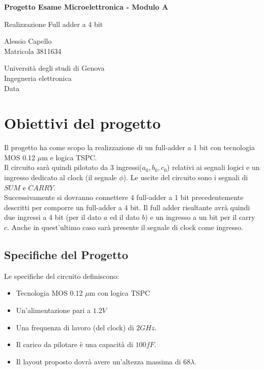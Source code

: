 \documentclass[12pt]{article} %
\begin{document}
\begin{center}
       \vspace*{1cm}
 
       \Large{\textbf{Progetto Esame Microelettronica - Modulo A}}
 
       \vspace{0.5cm}
        Realizzazione Full adder a 4 bit
 
       \vspace{1.5cm}
 
       Alessio Capello\\
 
       Matricola 3811634
 
       \vspace{1.5cm}
 
 
       Università degli studi di Genova\\
       Ingegneria elettronica\\
       Data   
\end{center}
\clearpage

\section{Obiettivi del progetto}
Il progetto ha come scopo la realizzazione di un full-adder a 1 bit con tecnologia MOS 0.12 $\mu$m e logica TSPC. \\
Il circuito sarà quindi pilotato da 3 ingressi($a_{0},b_{0}, c_{0}$) relativi ai segnali logici e un ingresso dedicato al clock (il segnale $\phi$).
Le uscite del circuito sono i segnali di $SUM$ e $CARRY$.\\
Successivamente si dovranno connettere 4 full-adder a 1 bit precedentemente descritti per comporre un full-adder a 4 bit.
Il full adder risultante avrà quindi due ingressi a 4 bit (per il dato $a$ ed il dato $b$) e un ingresso a un bit per il carry $c$. Anche in quest'ultimo caso sarà presente il segnale di clock come ingresso.
\subsection{Specifiche del Progetto}
Le specifiche del circuito definiscono:
\begin{itemize}
\item Tecnologia MOS 0.12 $\mu$m con logica TSPC
\item Un'alimentazione  pari a $1.2V$ 
\item Una frequenza di lavoro (del clock) di $2GHz$. 
\item Il carico da pilotare è una capacità di $100fF$.
\item Il layout proposto dovrà avere un'altezza massima di 68$\lambda$.
\end{itemize}
\end{document}
